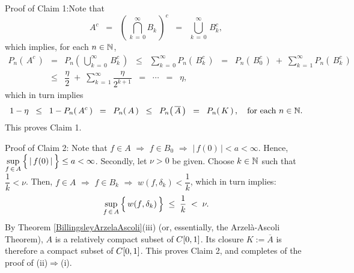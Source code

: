 \noindent
Proof of Claim 1:\quad Note that
\begin{equation*}
A^{c}
\;\; = \;\; \left(\,\bigcap_{k\,=\,0}^{\infty}B_{k}\,\right)^{c}
\;\; = \;\; \bigcup_{k\,=\,0}^{\infty}\,B_{k}^{c},
\end{equation*}
which implies, for each $n \in \mathbb{N}$,
\begin{eqnarray*}
P_{n}\!\left(\,A^{c}\,\right)
&=& P_{n}\!\left(\,\bigcup_{k\,=\,0}^{\infty}\,B_{k}^{c}\,\right)
	\;\;\leq\;\; \sum_{k\,=\,0}^{\infty}P_{n}\!\left(\,B_{k}^{c}\,\right)
	\;\;=\;\; P_{n}\!\left(\,B_{0}^{c}\,\right) \;+\; \sum_{k\,=\,1}^{\infty}P_{n}\!\left(\,B_{k}^{c}\,\right)
\\
&\leq& \dfrac{\eta}{2} \;+\; \sum_{k\,=\,1}^{\infty}\dfrac{\eta}{2^{k+1}}
	\;\;=\;\; \cdots \;\;=\;\; \eta,
\end{eqnarray*}
which in turn implies
\begin{equation*}
1 - \eta 
\;\;\leq\;\; 1 - P_{n}\!\left(\,A^{c}\,\right)
\;\;=\;\; P_{n}\!\left(\,A\,\right)
\;\;\leq\;\; P_{n}\!\left(\,\overline{A}\,\right) 
\;\;=\;\; P_{n}\!\left(\,K\,\right),
\quad\textnormal{for each $n \in \mathbb{N}$}.
\end{equation*}
This proves Claim 1.

\vskip 0.3cm
\noindent
Proof of Claim 2:\quad
Note that $f \in A$ $\Longrightarrow$ $f \in B_{0}$ $\Longrightarrow$ $\vert\,f(0)\,\vert < a < \infty$.
Hence, $\underset{f\,\in\,A}{\sup}\left\{\,\vert\,\overset{{\color{white}.}}{f}(0)\,\vert\,\right\} \leq a < \infty$.
Secondly, let $\nu > 0$ be given. Choose $k \in \mathbb{N}$ such that $\dfrac{1}{k} < \nu$.
Then, $f \in A$ $\Longrightarrow$ $f \in B_{k}$ $\Longrightarrow$ $w(f,\delta_{k}) < \dfrac{1}{k}$,
which in turn implies:
\begin{equation*}
\underset{f\,\in\,A}{\sup}\left\{\,w(\overset{{\color{white}.}}{f},\delta_{k})\,\right\} \;\leq\; \dfrac{1}{k} \;<\; \nu.
\end{equation*}
By Theorem \ref{BillingsleyArzelaAscoli}(iii) (or, essentially, the Arzel\`{a}-Ascoli Theorem),
$A$ is a relatively compact subset of $C[0,1]$. Its closure $K := \overline{A}$ is therefore
a compact subset of $C[0,1]$.
This proves Claim 2, and completes of the proof of (ii)\;$\Longrightarrow$\;(i).

